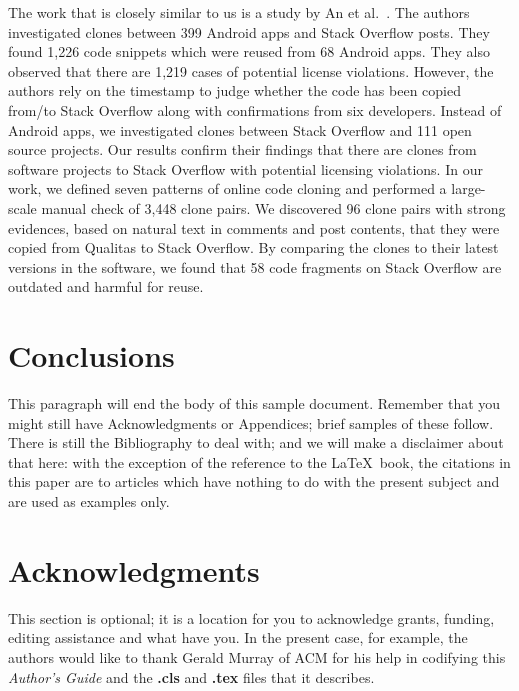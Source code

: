 \documentclass{sig-alternate-05-2015}
\begin{document}
The work that is closely similar to us is a study by An et al.~\cite{An2017}. The authors investigated clones between 399 Android apps and Stack Overflow posts. They found 1,226 code snippets which were reused from 68 Android apps. They also observed that there are 1,219 cases of potential license violations. However, the authors rely on the timestamp to judge whether the code has been copied from/to Stack Overflow along with confirmations from six developers. Instead of Android apps, we investigated clones between Stack Overflow and 111 open source projects. Our results confirm their findings that there are clones from software projects to Stack Overflow with potential licensing violations. In our work, we defined seven patterns of online code cloning and performed a large-scale manual check of 3,448 clone pairs. We discovered 96 clone pairs with strong evidences, based on natural text in comments and post contents, that they were copied from Qualitas to Stack Overflow. By comparing the clones to their latest versions in the software, we found that 58 code fragments on Stack Overflow are outdated and harmful for reuse.

\section{Conclusions}
This paragraph will end the body of this sample document.
Remember that you might still have Acknowledgments or
Appendices; brief samples of these
follow.  There is still the Bibliography to deal with; and
we will make a disclaimer about that here: with the exception
of the reference to the \LaTeX\ book, the citations in
this paper are to articles which have nothing to
do with the present subject and are used as
examples only.

\section{Acknowledgments}
This section is optional; it is a location for you
to acknowledge grants, funding, editing assistance and
what have you.  In the present case, for example, the
authors would like to thank Gerald Murray of ACM for
his help in codifying this \textit{Author's Guide}
and the \textbf{.cls} and \textbf{.tex} files that it describes.

%

  
\end{document}
